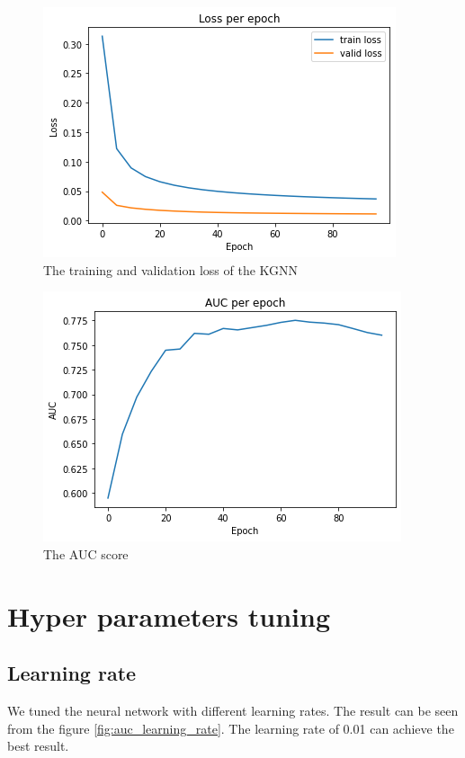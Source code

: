 \documentclass[11pt,twoside]{report}
\begin{document}
\begin{figure}[H]
    \centering
    \includegraphics[scale=0.9]{loss.png}
    \caption{The training and validation loss of the KGNN}
    \label{fig:training_loss}
\end{figure}

\begin{figure}[H]
    \centering
    \includegraphics[scale=0.9]{auc.png}
    \caption{The AUC score}
    \label{fig:auc}
\end{figure}

\section{Hyper parameters tuning}
\subsection{Learning rate}
We tuned the neural network with different learning rates. The result can be seen from the figure \ref{fig:auc_learning_rate}. The learning rate of 0.01 can achieve the best result.
\end{document}

